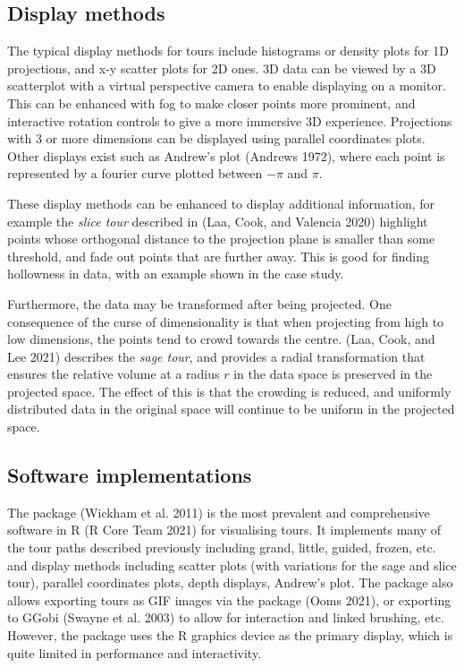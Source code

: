 \hypertarget{display-methods}{%
\subsection{Display methods}\label{display-methods}}

The typical display methods for tours include histograms or density plots for 1D projections, and x-y scatter plots for 2D ones. 3D data can be viewed by a 3D scatterplot with a virtual perspective camera to enable displaying on a monitor. This can be enhanced with fog to make closer points more prominent, and interactive rotation controls to give a more immersive 3D experience. Projections with 3 or more dimensions can be displayed using parallel coordinates plots. Other displays exist such as Andrew's plot (Andrews 1972), where each point is represented by a fourier curve plotted between \(-\pi\) and \(\pi\).

These display methods can be enhanced to display additional information, for example the \emph{slice tour} described in (Laa, Cook, and Valencia 2020) highlight points whose orthogonal distance to the projection plane is smaller than some threshold, and fade out points that are further away. This is good for finding hollowness in data, with an example shown in the case study.

Furthermore, the data may be transformed after being projected. One consequence of the curse of dimensionality is that when projecting from high to low dimensions, the points tend to crowd towards the centre. (Laa, Cook, and Lee 2021) describes the \emph{sage tour}, and provides a radial transformation that ensures the relative volume at a radius \(r\) in the data space is preserved in the projected space. The effect of this is that the crowding is reduced, and uniformly distributed data in the original space will continue to be uniform in the projected space.

\hypertarget{software-implementations}{%
\subsection{Software implementations}\label{software-implementations}}

The  package (Wickham et al. 2011) is the most prevalent and comprehensive software in R (R Core Team 2021) for visualising tours. It implements many of the tour paths described previously including grand, little, guided, frozen, etc. and display methods including scatter plots (with variations for the sage and slice tour), parallel coordinates plots, depth displays, Andrew's plot. The package also allows exporting tours as GIF images via the  package (Ooms 2021), or exporting to GGobi (Swayne et al. 2003) to allow for interaction and linked brushing, etc. However, the  package uses the R graphics device as the primary display, which is quite limited in performance and interactivity.

